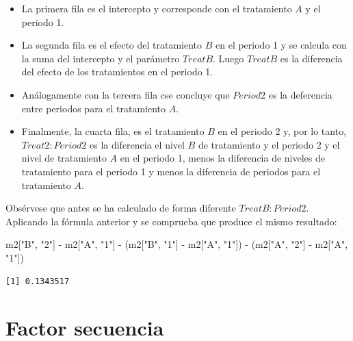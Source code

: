 \documentclass[
  12pt,
  a4paper,
  extrafontsizes,
  onecolumn,
  openright,
  table]{memoir}
\newenvironment{Shaded}{\begin{snugshade}}{\end{snugshade}}
\newcommand{\NormalTok}[1]{\textcolor[rgb]{0.00,0.23,0.31}{#1}}
\newcommand{\SpecialCharTok}[1]{\textcolor[rgb]{0.37,0.37,0.37}{#1}}
\newcommand{\StringTok}[1]{\textcolor[rgb]{0.13,0.47,0.30}{#1}}
\providecommand{\tightlist}{%
  \setlength{\itemsep}{0pt}\setlength{\parskip}{0pt}}\usepackage{longtable,booktabs,array}
\begin{document}
\begin{itemize}
\tightlist
\item
  La primera fila es el intercepto y corresponde con el tratamiento
  \(A\) y el periodo 1.
\item
  La segunda fila es el efecto del tratamiento \(B\) en el periodo 1 y
  se calcula con la suma del intercepto y el parámetro \(TreatB\). Luego
  \(TreatB\) es la diferencia del efecto de los tratamientos en el
  periodo 1.
\item
  Análogamente con la tercera fila cse concluye que \(Period2\) es la
  deferencia entre periodos para el tratamiento \(A\).
\item
  Finalmente, la cuarta fila, es el tratamiento \(B\) en el periodo 2 y,
  por lo tanto, \(Treat2:Period2\) es la diferencia el nivel \(B\) de
  tratamiento y el periodo 2 y el nivel de tratamiento \(A\) en el
  periodo 1, menos la diferencia de niveles de tratamiento para el
  periodo 1 y menos la diferencia de periodos para el tratamiento \(A\).
\end{itemize}

Obsérvese que antes se ha calculado de forma diferente
\(TreatB:Period2\). Aplicando la fórmula anterior y se comprueba que
produce el mismo resultado:

\scriptsize

\begin{Shaded}
\begin{Highlighting}[]
\NormalTok{m2[}\StringTok{"B"}\NormalTok{, }\StringTok{"2"}\NormalTok{] }\SpecialCharTok{{-}}\NormalTok{ m2[}\StringTok{"A"}\NormalTok{, }\StringTok{"1"}\NormalTok{] }\SpecialCharTok{{-}}\NormalTok{ (m2[}\StringTok{"B"}\NormalTok{, }\StringTok{"1"}\NormalTok{] }\SpecialCharTok{{-}}\NormalTok{ m2[}\StringTok{"A"}\NormalTok{, }\StringTok{"1"}\NormalTok{]) }\SpecialCharTok{{-}}\NormalTok{ (m2[}\StringTok{"A"}\NormalTok{, }\StringTok{"2"}\NormalTok{] }\SpecialCharTok{{-}}\NormalTok{ m2[}\StringTok{"A"}\NormalTok{, }\StringTok{"1"}\NormalTok{])}
\end{Highlighting}
\end{Shaded}

\begin{verbatim}
[1] 0.1343517
\end{verbatim}

\normalsize

\hypertarget{factor-secuencia}{%
\section{Factor secuencia}\label{factor-secuencia}}
\end{document}
